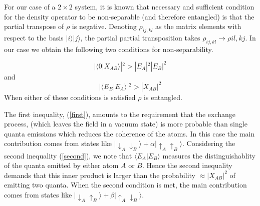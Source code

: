 \documentclass[12pt]{article}
\newcommand{\beq}{\begin{equation}}
\newcommand{\eeq}{\end{equation}}
\def \la {\langle}
\def \ra {\rangle}
\def \up {\uparrow}
\def \down {\downarrow}
\begin{document}
For our case of a $2\times 2$ system,
it is known that necessary
\cite{peres} and sufficient \cite{horodecki}
condition for the density operator to be non-separable (and
therefore
entangled)
is that the partial transpose of $\rho$ is negative.
Denoting $\rho_{ij,kl}$ as the matrix
elements  with respect to the basis $|i\ra|j\ra$,
the partial partial transposition takes
$\rho_{ij,kl}\to \rho{il,kj}$.
In our case we obtain the
following two conditions for non-separability.

\beq
|\la 0|X_{AB}\ra|^2 > |E_A|^2 |E_B|^2
\label{first}
\eeq
and
\beq
|\la E_B|E_A\ra|^2 > |X_{AB}|^2
\label{second}
\eeq
When either of these conditions is satisfied $\rho$
is entangled.


The first inequality, (\ref{first}),
 amounts to the requirement that the exchange
process, (which leaves the field in a vacuum state) is more
probable than single quanta emissions
which reduces the coherence of the atoms.
In this case the main contribution comes from states like
$|\down_A\down_B\ra + \alpha |\up_A\up_B\ra$.
Considering the second inequality (\ref{second}),
we note that $\la E_A|E_B\ra$ measures the distinguishablity
of the quanta emitted by either atom $A$ or $B$. Hence
the second inequality demands that
this inner product is larger than the probability $\approx
|X_{AB}|^2$ of emitting two quanta. When the second condition
is met, the main contribution comes from states like
 $|\down_A\up_B\ra + \beta |\up_A\down_B\ra$.
\end{document}
